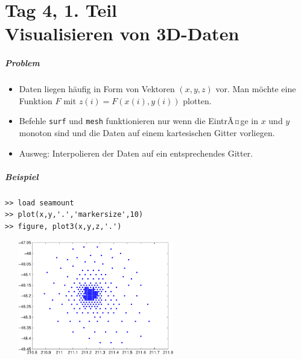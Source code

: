 \subtitle{Einheit 4 \\Visualisieren von 3D-Daten \\ Datenstrukturen \\In- und
Output}
\maketitle
\part{Tag 4, 1. Teil \\ Visualisieren von 3D-Daten}

%
% 
\begin{frame}[fragile]\frametitle{Problem}
\begin{itemize}
\item Daten liegen h\"aufig in Form von Vektoren $(x,y,z)$ vor. Man m\"ochte
  eine Funktion $F$ mit $z(i)=F(x(i),y(i))$ plotten.
\item Befehle \lstinline!surf! und \lstinline!mesh! funktionieren nur wenn  die
  EintrÃ¤ge in $x$ und $y$ monoton sind und die Daten auf einem kartesischen
  Gitter vorliegen.
\item Ausweg: Interpolieren der Daten auf ein entsprechendes Gitter. 
\end{itemize}
\end{frame}
%
% 
\begin{frame}[fragile]\frametitle{Beispiel}
\begin{lstlisting}
>> load seamount
>> plot(x,y,'.','markersize',10)
>> figure, plot3(x,y,z,'.')
\end{lstlisting}
\begin{center}
\includegraphics[width=8cm, height=5cm]{./figures/beispiel_scattered_data}
\end{center}
\end{frame}
%
% 
